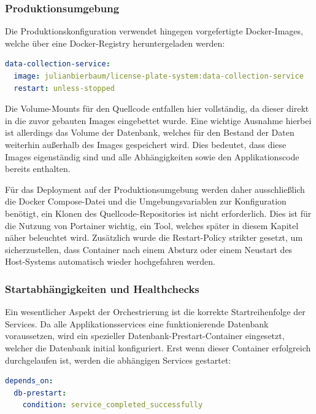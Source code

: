 \newpage
\subsubsection{Produktionsumgebung}

Die Produktionskonfiguration verwendet hingegen vorgefertigte Docker-Images, welche über eine Docker-Registry heruntergeladen werden:

\begin{lstlisting}[language=yaml, caption={Image Produktions-Compose-Konfiguration}, label={lst:compose_prod}]
data-collection-service:
  image: julianbierbaum/license-plate-system:data-collection-service
  restart: unless-stopped
\end{lstlisting}

Die Volume-Mounts für den Quellcode entfallen hier vollständig, da dieser direkt in die zuvor gebauten Images eingebettet wurde.
Eine wichtige Ausnahme hierbei ist allerdings das Volume der Datenbank, welches für den Bestand der Daten weiterhin außerhalb des Images gespeichert wird.
Dies bedeutet, dass diese Images eigenständig sind und alle Abhängigkeiten sowie den Applikationscode bereits enthalten.

Für das Deployment auf der Produktionsumgebung werden daher ausschließlich die Docker Compose-Datei und die Umgebungsvariablen zur Konfiguration benötigt, ein Klonen des Quellcode-Repositories ist nicht erforderlich.
Dies ist für die Nutzung von Portainer wichtig, ein Tool, welches später in diesem Kapitel näher beleuchtet wird.
Zusätzlich wurde die Restart-Policy strikter gesetzt, um sicherzustellen, dass Container nach einem Absturz oder einem Neustart des Host-Systems automatisch wieder hochgefahren werden.


\subsubsection{Startabhängigkeiten und Healthchecks}

Ein wesentlicher Aspekt der Orchestrierung ist die korrekte Startreihenfolge der Services.
Da alle Applikationsservices eine funktionierende Datenbank voraussetzen, wird ein spezieller Datenbank-Prestart-Container eingesetzt, welcher die Datenbank initial konfiguriert.
Erst wenn dieser Container erfolgreich durchgelaufen ist, werden die abhängigen Services gestartet:

\begin{lstlisting}[language=yaml, caption={Startabhängigkeiten Datenbank Prestart}, label={lst:compose_depends}]
depends_on:
  db-prestart:
    condition: service_completed_successfully
\end{lstlisting}

